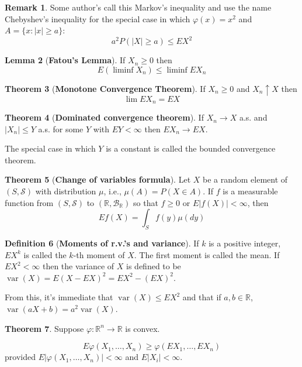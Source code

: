 \documentclass{article}
\theoremstyle{definition}
\newtheorem{theorem}{Theorem}[section]
\newtheorem{lemma}[theorem]{Lemma}
\newtheorem{definition}[theorem]{Definition}
\newtheorem{remark}[theorem]{Remark}
\begin{document}
\begin{remark}
    Some author's call this Markov's inequality and use the name Chebyshev's inequality for the special case in which $\varphi(x) = x^2$ and $A = \{ x : |x| \geq a \}$:
    $$ a^2 P(|X| \geq a) \leq EX^2$$
\end{remark}

\begin{lemma}[\textbf{Fatou's Lemma}]
    If $X_n \geq 0$ then
    $$ E(\liminf X_n) \leq \liminf EX_n$$
\end{lemma}

\begin{theorem}[\textbf{Monotone Convergence Theorem}]
    If $X_n \geq 0$ and $X_n \uparrow X$ then
    $$ \lim E X_n = E X$$
\end{theorem}

\begin{theorem}[\textbf{Dominated convergence theorem}]
    If $X_n \to X$ a.s. and $|X_n| \leq Y$ a.s. for some $Y$ with $EY < \infty$ then $EX_n \to EX$.
\end{theorem}

The special case in which $Y$ is a constant is called the bounded convergence theorem.

\begin{theorem}[\textbf{Change of variables formula}]
    Let $X$ be a random element of $(S, \mathcal{S})$ with distribution $\mu$, i.e., $\mu(A) = P(X \in A)$.
    If $f$ is a measurable function from $(S, \mathcal{S})$ to $(\mathbb{R}, \mathcal{B}_{\mathbb{R}})$ so that $f \geq 0$ or
    $E|f(X)| < \infty$, then
    $$ E f(X) = \int_S f(y) \mu(dy)$$
\end{theorem}

\begin{definition}[\textbf{Moments of r.v.'s and variance}]
    If $k$ is a positive integer, $EX^k$ is called the $k$-th moment of $X$. The first moment is called the mean. If $EX^2 < \infty$ then the variance of $X$ is defined to be $\operatorname{var}(X) = E(X - EX)^2 = EX^2 - (EX)^2$.
\end{definition}

From this, it's immediate that $\operatorname{var}(X) \leq EX^2$ and that if $a, b \in \mathbb{R}$, $\operatorname{var}(aX+b)=a^2 \operatorname{var}(X)$.

\begin{theorem}
    Suppose $\varphi : \mathbb{R}^n \to \mathbb{R}$ is convex.

    $$ E\varphi(X_1, \dots, X_n) \geq \varphi(E X_1, \dots, EX_n)$$
    provided $E| \varphi(X_1, \dots, X_n) | < \infty$ and $E |X_i| < \infty$.
\end{theorem}
\end{document}
